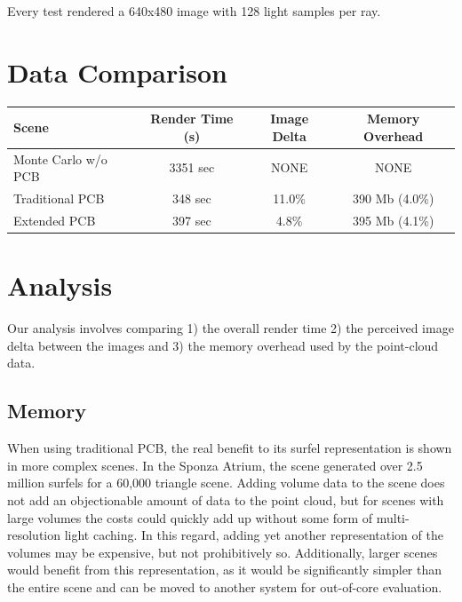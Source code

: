 \documentclass[12pt]{ucthesis}
\begin{document}
Every test rendered a 640x480 image with 128 light samples per ray.

\section{Data Comparison}

\begin{center}
\setlength{\tabcolsep}{5pt}
\begin{tabular}{ | l | c | c | c | }
  \hline                       
  Scene & Render Time (s) & Image Delta & Memory Overhead \\
  \hline                  
  Monte Carlo w/o PCB & 3351 sec & NONE & NONE \\
  Traditional PCB & 348 sec & 11.0\% & 390 Mb (4.0\%) \\
  Extended PCB & 397 sec & 4.8\% & 395 Mb (4.1\%)  \\
  \hline  
\end{tabular}
\label{Data Comparison}
\end{center}


\section{Analysis}
Our analysis involves comparing 1) the overall render time 2) the perceived image delta between the images and 3) the memory overhead used by the point-cloud data.

\subsection{Memory}
When using traditional PCB, the real benefit to its surfel representation is shown in more complex scenes.  In the Sponza Atrium, the scene generated over 2.5 million surfels for a 60,000 triangle scene.  Adding volume data to the scene does not add an objectionable amount of data to the point cloud, but for scenes with large volumes the costs could quickly add up without some form of multi-resolution light caching.  In this regard, adding yet another representation of the volumes may be expensive, but not prohibitively so.  Additionally, larger scenes would benefit from this representation, as it would be significantly simpler than the entire scene and can be moved to another system for out-of-core evaluation.
\end{document}
